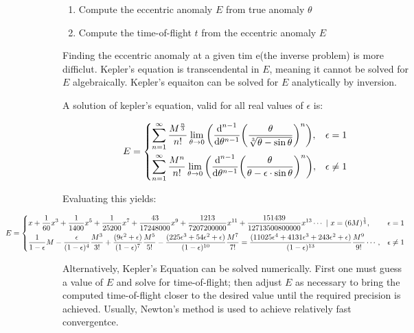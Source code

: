 \documentclass[12pt]{article}
\begin{document}
\begin{enumerate}
  \item Compute the eccentric anomaly \(E\) from true anomaly \(\theta\)
  \item Compute the time-of-flight \(t\) from the eccentric anomaly \(E\)
\end{enumerate}

Finding the eccentric anomaly at a given tim e(the inverse problem) is more difficlut. Kepler's equation is transcendental in \(E\), meaning it cannot be solved for \(E\) algebraically. Kepler's equaiton can be solved for \(E\) analytically by inversion.

A solution of kepler's equation, valid for all real values of \(\epsilon\) is:

\begin{align*}
  E=\begin{dcases}
  \sum\limits_{n=1}^{\infty} {\frac{M^{\frac{n}{3}}}{n!}} \lim\limits_{\theta \to 0} {\left(\frac{\text{d}^{n-1}}{\text{d}\theta^{n-1}} {\left(\frac{\theta}{\sqrt[3]{\theta-\sin\theta}}\right)}^{n}\right)} , & \epsilon = 1 \\
  \sum\limits_{n=1}^{\infty} {\frac{M^{n}}{n!}} \lim\limits_{\theta \to 0} {\left(\frac{\text{d}^{n-1}}{\text{d}\theta^{n-1}} {\left(\frac{\theta}{\theta-\epsilon \cdot \sin \theta}\right)}^{n}\right)} , & \epsilon \ne 1
  \end{dcases}
\end{align*}

Evaluating this yields:

\begin{displaymath}
  \hspace*{-0.2 \textwidth} \resizebox{ 1.4 \textwidth}{!}{$E=\begin{dcases} x + \frac{1}{60} x^3 + \frac{1}{1400} x^5 + \frac{1}{25200} x^7 + \frac{43}{17248000}x^9 + \frac{1213}{7207200000} x^{11} + \frac{151439}{12713500800000} x^{13} \cdots \ | \ x=(6M)^\frac{1}{3} , & \epsilon = 1 \\ \frac{1}{1-\epsilon}M-\frac{\epsilon}{(1-\epsilon)^4}\frac{M^3}{3!} + \frac{(9\epsilon^2+\epsilon)}{(1-\epsilon)^7}\frac{M^5}{5!} - \frac{(225\epsilon^3+54\epsilon^2+\epsilon)}{(1-\epsilon)^{10}}\frac{M^7}{7!} = \frac{(11025\epsilon^4 + 4131\epsilon^3+243\epsilon^2+\epsilon)}{(1-\epsilon)^{13}}\frac{M^9}{9!} \cdots , & \epsilon \ne 1 \end{dcases} $
    }
\end{displaymath}

Alternatively, Kepler's Equation can be solved numerically. First one must guess a value of \(E\) and solve for time-of-flight; then adjust \(E\) as necessary to bring the computed time-of-flight closer to the desired value until the required precision is achieved. Usually, Newton's method is used to achieve relatively fast convergentce.
\end{document}
